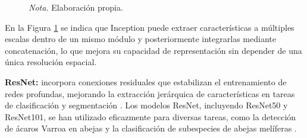 \begin{figure}[h]
\label{fig:estructura_inception}
    
    \vspace{0.2cm}
    \caption*{\normalfont\normalsize\textit{Nota.} Elaboración propia.}

\end{figure}

\vspace{-0.5cm}
En la Figura \ref{fig:estructura_inception} se indica que Inception puede extraer características a múltiples escalas dentro de un mismo módulo y posteriormente integrarlas mediante concatenación, lo que mejora su capacidad de representación sin depender de una única resolución espacial.

\par\indent\textbullet\hspace{0.2cm} \textbf{ResNet:} incorpora conexiones residuales que estabilizan el entrenamiento de redes profundas, mejorando la extracción jerárquica de características en tareas de clasificación y segmentación \parencite{Anumol2023,Srinivas2025}. Los modelos ResNet, incluyendo ResNet50 y ResNet101, se han utilizado eficazmente para diversas tareas, como la detección de ácaros Varroa en abejas y la clasificación de subespecies de abejas melíferas \parencite{sharma2024varroa}. \\  

